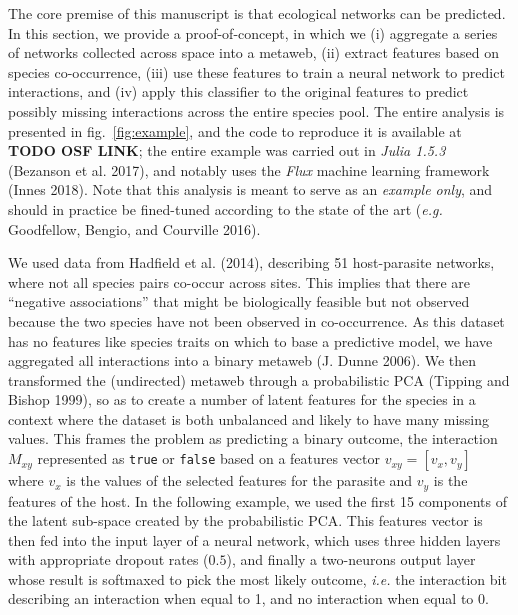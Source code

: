 \documentclass[11pt]{article}
\begin{document}
The core premise of this manuscript is that ecological networks can be
predicted. In this section, we provide a proof-of-concept, in which we
(i) aggregate a series of networks collected across space into a
metaweb, (ii) extract features based on species co-occurrence, (iii) use
these features to train a neural network to predict interactions, and
(iv) apply this classifier to the original features to predict possibly
missing interactions across the entire species pool. The entire analysis
is presented in fig.~\ref{fig:example}, and the code to reproduce it is
available at \textbf{TODO OSF LINK}; the entire example was carried out
in \emph{Julia 1.5.3} (Bezanson et al. 2017), and notably uses the
\emph{Flux} machine learning framework (Innes 2018). Note that this
analysis is meant to serve as an \emph{example only}, and should in
practice be fined-tuned according to the state of the art (\emph{e.g.}
Goodfellow, Bengio, and Courville 2016).

We used data from Hadfield et al. (2014), describing 51 host-parasite
networks, where not all species pairs co-occur across sites. This
implies that there are ``negative associations'' that might be
biologically feasible but not observed because the two species have not
been observed in co-occurrence. As this dataset has no features like
species traits on which to base a predictive model, we have aggregated
all interactions into a binary metaweb (J. Dunne 2006). We then
transformed the (undirected) metaweb through a probabilistic PCA
(Tipping and Bishop 1999), so as to create a number of latent features
for the species in a context where the dataset is both unbalanced and
likely to have many missing values. This frames the problem as
predicting a binary outcome, the interaction \(M_{xy}\) represented as
\texttt{true} or \texttt{false} based on a features vector
\(v_{xy} = [v_x, v_y]\) where \(v_x\) is the values of the selected
features for the parasite and \(v_y\) is the features of the host. In
the following example, we used the first 15 components of the latent
sub-space created by the probabilistic PCA. This features vector is then
fed into the input layer of a neural network, which uses three hidden
layers with appropriate dropout rates (\(0.5\)), and finally a
two-neurons output layer whose result is softmaxed to pick the most
likely outcome, \emph{i.e.} the interaction bit describing an
interaction when equal to 1, and no interaction when equal to 0.
\end{document}
